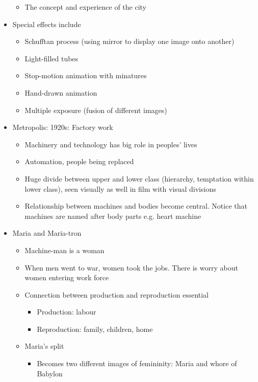 \documentclass[11pt,fleqn]{book} %
\begin{document}
\begin{descriptions}
\begin{itemize}
\begin{itemize}
            \item The concept and experience of the city
        \end{itemize}
        \item Special effects include
        \begin{itemize}
            \item Schufftan process (using mirror to display one image onto another)
            \item Light-filled tubes
            \item Stop-motion animation with minatures
            \item Hand-drawn animation
            \item Multiple exposure (fusion of different images)
        \end{itemize}
        \item Metropolis: 1920s: Factory work
        \begin{itemize}
            \item Machinery and technology has big role in peoples' lives
            \item Automation, people being replaced
            \item Huge divide between upper and lower class (hierarchy, temptation within lower class), seen visually as well in film with visual divisions
            \item Relationship between machines and bodies become central. Notice that machines are named after body parts e.g. heart machine
        \end{itemize} 
        \item Maria and Maria-tron
        \begin{itemize}
            \item Machine-man is a woman
            \item When men went to war, women took the jobs. There is worry about women entering work force
            \item Connection between production and reproduction essential
            \begin{itemize}
                \item Production: labour
                \item Reproduction: family, children, home
            \end{itemize}
            \item Maria's split
            \begin{itemize}
                \item Becomes two different images of femininity: Maria and whore of Babylon

\end{itemize}
\end{itemize}
\end{itemize}
\end{descriptions}
\end{document}

